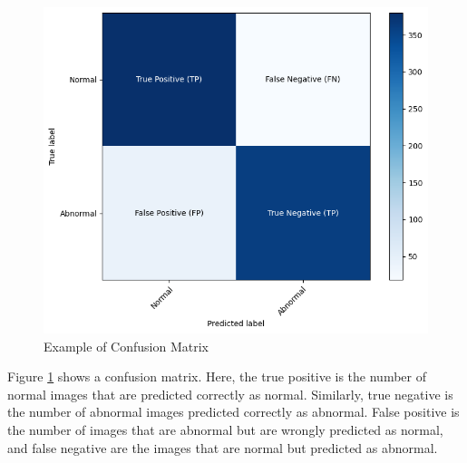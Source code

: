\begin{figure}[ht!]
    \centering
    \includegraphics[width=1\linewidth]{Images/confusion_matrix_labeled.png}
    \caption{Example of Confusion Matrix}
    \label{fig:confusion matrix}
\end{figure}

Figure \ref{fig:confusion matrix} shows a confusion matrix. Here, the true positive is the number of normal images that are predicted correctly as normal. Similarly, true negative is the number of abnormal images predicted correctly as abnormal. False positive is the number of images that are abnormal but are wrongly predicted as normal, and false negative are the images that are normal but predicted as abnormal.


